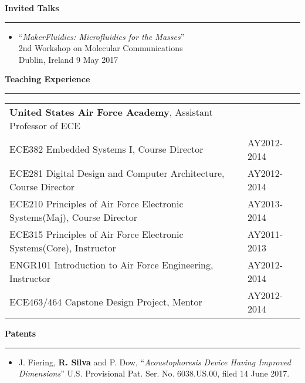 \newpage

\large
\textbf{Invited Talks}\\
\rule{\textwidth}{1pt}

\small
\begin{itemize}
	\item ``\textit{MakerFluidics: Microfluidics for the Masses}'' \\2nd Workshop on Molecular Communications\\Dublin, Ireland 9 May 2017
\end{itemize}


\large
\textbf{Teaching Experience}\\
\rule{\textwidth}{1pt}

\begin{table}[h!]
\centering
\small
\begin{tabular}{ p{12.5cm} p{4.5cm}}
	\textbf{United States Air Force Academy}, Assistant Professor of ECE& \\
ECE382 Embedded Systems I, Course Director& AY2012-2014\\
ECE281 Digital Design and Computer Architecture, Course Director & AY2012-2014\\
ECE210 Principles of Air Force Electronic Systems(Maj), Course Director & AY2013-2014\\
ECE315 Principles of Air Force Electronic Systems(Core), Instructor & AY2011-2013\\
ENGR101 Introduction to Air Force Engineering, Instructor & AY2012-2014\\
ECE463/464 Capstone Design Project, Mentor & AY2012-2014
\end{tabular}
\end{table}

\large
\textbf{Patents}\\
\rule{\textwidth}{1pt}

\small
\begin{itemize}
	\item{J. Fiering, \textbf{R. Silva} and P. Dow, ``\textit{Acoustophoresis Device Having Improved Dimensions}'' U.S. Provisional Pat. Ser. No. 6038.US.00, filed 14 June 2017.}
\end{itemize}

